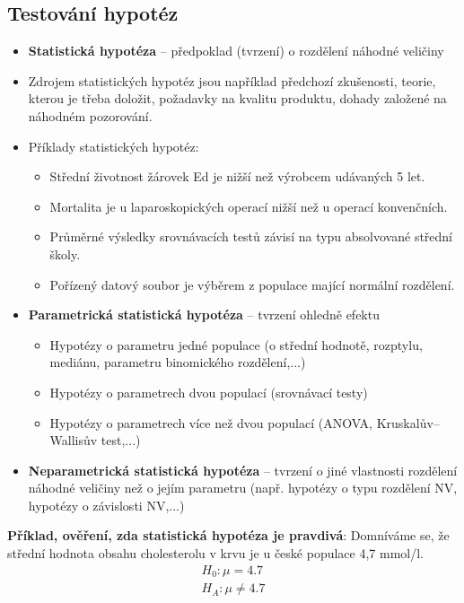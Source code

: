 \subsection{Testování hypotéz}
\begin{itemize}
	\item \textbf{Statistická hypotéza} -- předpoklad (tvrzení) o rozdělení náhodné veličiny
	\item Zdrojem statistických hypotéz jsou například předchozí zkušenosti, teorie, kterou je třeba doložit, požadavky na kvalitu produktu, dohady založené na náhodném pozorování.
	\item Příklady statistických hypotéz:
	\begin{itemize}
		\item Střední životnost žárovek Ed je nižší než výrobcem udávaných 5 let.
		\item Mortalita je u laparoskopických operací nižší než u operací konvenčních.
		\item Průměrné výsledky srovnávacích testů závisí na typu absolvované střední školy.
		\item Pořízený datový soubor je výběrem z populace mající normální rozdělení.
	\end{itemize}
	\item \textbf{Parametrická statistická hypotéza} -- tvrzení ohledně efektu
	\begin{itemize}
		\item Hypotézy o parametru jedné populace (o střední hodnotě, rozptylu, mediánu, parametru binomického rozdělení,...)
		\item Hypotézy o parametrech dvou populací (srovnávací testy)
		\item Hypotézy o parametrech více než dvou populací (ANOVA, Kruskalův--Wallisův test,...)
	\end{itemize}
	\item \textbf{Neparametrická statistická hypotéza} -- tvrzení o jiné vlastnosti rozdělení náhodné veličiny než o jejím parametru (např. hypotézy o typu rozdělení NV, hypotézy o závislosti NV,...)
\end{itemize}
\textbf{Příklad, ověření, zda statistická hypotéza je pravdivá}: Domníváme se, že střední hodnota obsahu cholesterolu v krvu je u české populace 4,7 mmol/l.
	\begin{equation*}
		\begin{split}
			H_0 : \mu = 4.7	 \\
			H_A : \mu \not = 4.7 
		\end{split}
	\end{equation*}

